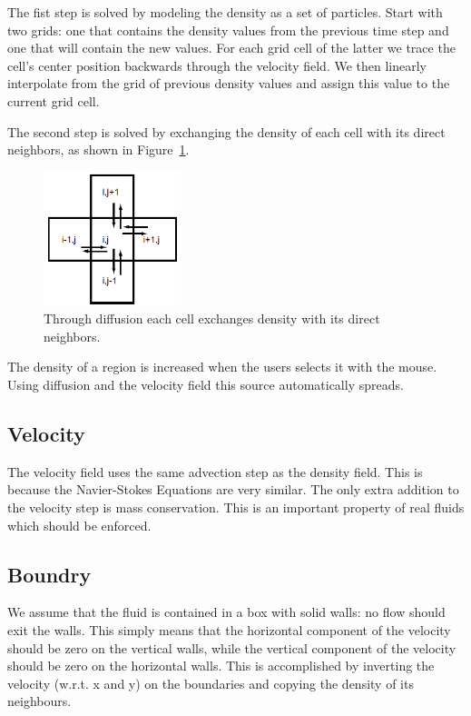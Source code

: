 \noindent The fist step is solved by modeling the density as a set of particles.
Start with two grids: one that contains the density values from the previous time step and one that will contain the new values.
For each grid cell of the latter we trace the cell’s center position backwards through the velocity field.
We then linearly interpolate from the grid of previous density values and assign this value to the current grid cell.

\noindent The second step is solved by exchanging the density of each cell with its direct neighbors, as shown in Figure~\ref{fig:diffuse}.

\begin{figure}[h]
    \centering
    \includegraphics[width=4cm]{img/diffuse.png}
    \caption{Through diffusion each cell exchanges density with its direct neighbors.}
    \label{fig:diffuse}
\end{figure}

\noindent The density of a region is increased when the users selects it with the mouse.
Using diffusion and the velocity field this source automatically spreads.


\subsection{Velocity}
The velocity field uses the same advection step as the density field.
This is because the Navier-Stokes Equations are very similar.
The only extra addition to the velocity step is mass conservation.
This is an important property of real fluids which should be enforced.

\subsection{Boundry}
We assume that the fluid is contained in a box with solid walls: no flow should exit the walls.
This simply means that the horizontal component of the velocity should be zero on the vertical walls, while the vertical component of the velocity should be zero on the horizontal walls.
This is accomplished by inverting the velocity (w.r.t. x and y) on the boundaries and copying the density of its neighbours.

